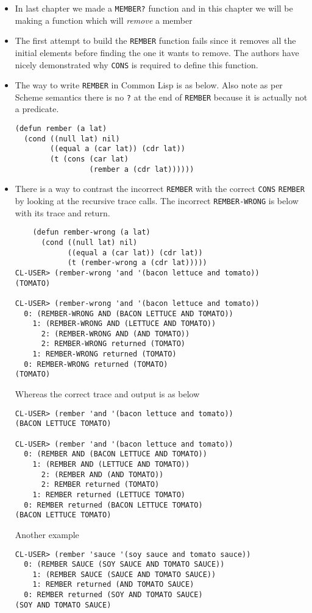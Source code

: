 \documentclass[11pt]{article}
\begin{document}
\begin{itemize}
\item In last chapter we made a \texttt{MEMBER?} function and in this chapter we will be making a function which will \emph{remove}
a member
\item The first attempt to build the \texttt{REMBER} function fails since it removes all the initial elements before finding the
one it wants to remove. The authors have nicely demonstrated why \texttt{CONS} is required to define this function.
\item The way to write \texttt{REMBER} in Common Lisp is as below. Also note as per Scheme semantics there is no \texttt{?} at the end
of \texttt{REMBER} because it is actually not a predicate.
\begin{verbatim}
(defun rember (a lat)
  (cond ((null lat) nil)
        ((equal a (car lat)) (cdr lat))
        (t (cons (car lat)
                 (rember a (cdr lat))))))

\end{verbatim}
\item There is a way to contrast the incorrect \texttt{REMBER} with the correct \texttt{CONS} \texttt{REMBER} by looking at the recursive
trace calls. The incorrect \texttt{REMBER-WRONG} is below with its trace and return.
\begin{verbatim}
    (defun rember-wrong (a lat)
      (cond ((null lat) nil)
            ((equal a (car lat)) (cdr lat))
            (t (rember-wrong a (cdr lat)))))
CL-USER> (rember-wrong 'and '(bacon lettuce and tomato))
(TOMATO)

CL-USER> (rember-wrong 'and '(bacon lettuce and tomato))
  0: (REMBER-WRONG AND (BACON LETTUCE AND TOMATO))
    1: (REMBER-WRONG AND (LETTUCE AND TOMATO))
      2: (REMBER-WRONG AND (AND TOMATO))
      2: REMBER-WRONG returned (TOMATO)
    1: REMBER-WRONG returned (TOMATO)
  0: REMBER-WRONG returned (TOMATO)
(TOMATO)

\end{verbatim}
Whereas the correct trace and output is as below
\begin{verbatim}
CL-USER> (rember 'and '(bacon lettuce and tomato))
(BACON LETTUCE TOMATO)

CL-USER> (rember 'and '(bacon lettuce and tomato))
  0: (REMBER AND (BACON LETTUCE AND TOMATO))
    1: (REMBER AND (LETTUCE AND TOMATO))
      2: (REMBER AND (AND TOMATO))
      2: REMBER returned (TOMATO)
    1: REMBER returned (LETTUCE TOMATO)
  0: REMBER returned (BACON LETTUCE TOMATO)
(BACON LETTUCE TOMATO)

\end{verbatim}
Another example
\begin{verbatim}
CL-USER> (rember 'sauce '(soy sauce and tomato sauce))
  0: (REMBER SAUCE (SOY SAUCE AND TOMATO SAUCE))
    1: (REMBER SAUCE (SAUCE AND TOMATO SAUCE))
    1: REMBER returned (AND TOMATO SAUCE)
  0: REMBER returned (SOY AND TOMATO SAUCE)
(SOY AND TOMATO SAUCE)

\end{verbatim}
\end{itemize}
\end{document}
